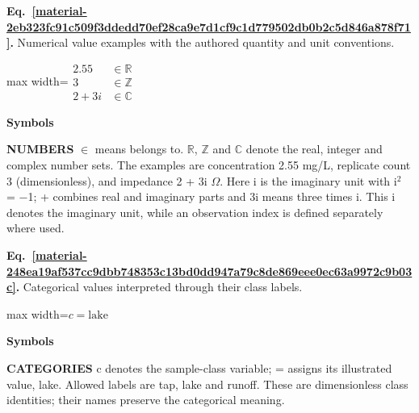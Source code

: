 \documentclass[11pt,a4paper]{article}
\begin{document}
\par\medskip
\noindent\begin{minipage}{\linewidth}
\label{material-2eb323fc91c509f3ddedd70ef28ca9e7d1cf9c1d779502db0b2c5d846a878f71}
\noindent\textbf{Eq.~\ref*{material-2eb323fc91c509f3ddedd70ef28ca9e7d1cf9c1d779502db0b2c5d846a878f71}.} Numerical value examples with the authored quantity and unit conventions.\par\nopagebreak
\begin{center}\begin{adjustbox}{max width=\linewidth}$\displaystyle \begin{aligned}2.55 &\in \mathbb{R}\\3 &\in \mathbb{Z}\\2+3i &\in \mathbb{C}\end{aligned}$\end{adjustbox}\end{center}

\par\noindent\textbf{Symbols}

\par\noindent\textbf{NUMBERS} \ensuremath{\in} means belongs to. \ensuremath{\mathbb{R}}, \ensuremath{\mathbb{Z}} and \ensuremath{\mathbb{C}} denote the real, integer and complex number sets. The examples are concentration 2.55 mg/L, replicate count 3 (dimensionless), and impedance 2 + 3i \ensuremath{\Omega}. Here i is the imaginary unit with i\ensuremath{{}^2} = \ensuremath{-}1; + combines real and imaginary parts and 3i means three times i. This i denotes the imaginary unit, while an observation index is defined separately where used.

\end{minipage}\par
\medskip

\par\medskip
\noindent\begin{minipage}{\linewidth}
\label{material-248ea19af537cc9dbb748353c13bd0dd947a79c8de869eee0ec63a9972c9b03c}
\noindent\textbf{Eq.~\ref*{material-248ea19af537cc9dbb748353c13bd0dd947a79c8de869eee0ec63a9972c9b03c}.} Categorical values interpreted through their class labels.\par\nopagebreak
\begin{center}\begin{adjustbox}{max width=\linewidth}$\displaystyle c=\text{lake}$\end{adjustbox}\end{center}

\par\noindent\textbf{Symbols}

\par\noindent\textbf{CATEGORIES} c denotes the sample-class variable; = assigns its illustrated value, lake. Allowed labels are tap, lake and runoff. These are dimensionless class identities; their names preserve the categorical meaning.

\end{minipage}\par
\medskip
\end{document}
